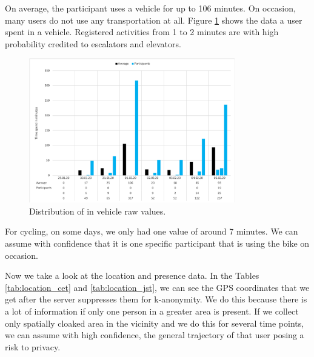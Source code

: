 On average, the participant uses a vehicle for up to 106 minutes. On occasion, many users do not use any transportation at all. Figure \ref{fig:diagram_vehicle} shows the data a user spent in a vehicle. Registered activities from 1 to 2 minutes are with high probability credited to escalators and elevators.  

\begin{figure}[htbp]
  \centering
  \includegraphics[width=0.8\textwidth]{figures/diagram_vehicle.png}
  \caption{Distribution of in vehicle raw values.} \label{fig:diagram_vehicle}
\end{figure}

For cycling, on some days, we only had one value of around 7 minutes. We can assume with confidence that it is one specific participant that is using the bike on occasion.

Now we take a look at the location and presence data. In the Tables \ref{tab:location_cet} and \ref{tab:location_jst}, we can see the GPS coordinates that we get after the server suppresses them for k-anonymity. We do this because there is a lot of information if only one person in a greater area is present. If we collect only spatially cloaked area in the vicinity and we do this for several time points, we can assume with high confidence, the general trajectory of that user posing a risk to privacy.

